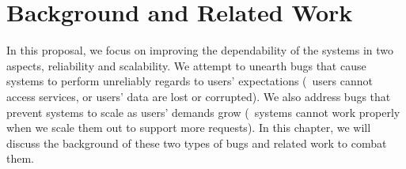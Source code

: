 \chapter{Background and Related Work}
\label{chp-bg}

In this proposal, we focus on improving the dependability of the systems in two
aspects, reliability and scalability. We attempt to unearth bugs that cause
systems to perform unreliably regards to users' expectations (\eg\ users cannot
access services, or users' data are lost or corrupted). We also address bugs
that prevent systems to scale as users' demands grow (\ie\ systems cannot work
properly when we scale them out to support more requests). In this chapter, we
will discuss the background of these two types of bugs and related work to
combat them.




